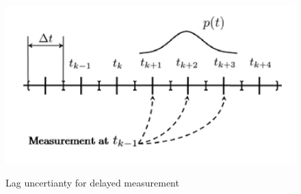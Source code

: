 \begin{figure}
	{\includegraphics[width=1.0\columnwidth]{./img/delay_uncertainty.png}}
	\caption{Lag uncertianty for delayed measurement}
	\label{fig:delay_uncertainty}
\end{figure}

